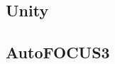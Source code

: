 \subsection{Unity}\label{sec:simulators:unity}

\clearpage
\clearpage
\subsection{AutoFOCUS3}\label{sec:simulators:autofocus3}
